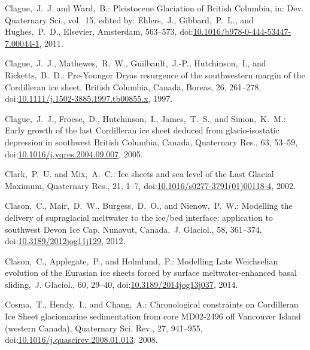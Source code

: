 \documentclass[tc, manuscript]{copernicus}
\begin{document}
\begin{thebibliography}{114}
Clague,~J.~J. and Ward,~B.: Pleistocene Glaciation of British
Columbia, in:   Dev. Quaternary Sci., vol.~15, edited by: Ehlers,~J., Gibbard,~P.~L., and Hughes,~P.~D., Elsevier, Amsterdam, 563--573,
doi:\href{http://dx.doi.org/10.1016/b978-0-444-53447-7.00044-1}{10.1016/b978-0-444-53447-7.00044-1}, 2011.


Clague,~J.~J., Mathewes,~R.~W., Guilbault,~J.-P., Hutchinson,~I., and Ricketts,~B.~D.: Pre-Younger Dryas resurgence of the southwestern margin of the Cordilleran ice sheet, British Columbia, Canada, Boreas, 26, 261--278,
doi:\href{http://dx.doi.org/10.1111/j.1502-3885.1997.tb00855.x}{10.1111/j.1502-3885.1997.tb00855.x}, 1997.


Clague,~J.~J., Froese,~D., Hutchinson,~I., James,~T.~S., and Simon,~K.~M.: Early growth of the last Cordilleran ice sheet deduced from glacio-isostatic depression in southwest British Columbia, Canada, Quaternary Res., 63, 53--59,
doi:\href{http://dx.doi.org/10.1016/j.yqres.2004.09.007}{10.1016/j.yqres.2004.09.007}, 2005.


Clark,~P.~U. and Mix,~A.~C.: Ice sheets and sea level of the Last Glacial Maximum, Quaternary Res., 21, 1--7,
doi:\href{http://dx.doi.org/10.1016/s0277-3791(01)00118-4}{10.1016/s0277-3791(01)00118-4}, 2002.


Clason,~C., Mair,~D.~W., Burgess,~D.~O., and Nienow,~P.~W.: Modelling the delivery of supraglacial meltwater to the ice/bed interface: application to southwest Devon Ice Cap, Nunavut, Canada,~J. Glaciol., 58, 361--374,
doi:\href{http://dx.doi.org/10.3189/2012jog11j129}{10.3189/2012jog11j129}, 2012.


Clason,~C., Applegate,~P., and Holmlund,~P.: Modelling Late Weichselian evolution of the Eurasian ice sheets forced by surface meltwater-enhanced basal sliding,~J. Glaciol., 60, 29--40,
doi:\href{http://dx.doi.org/10.3189/2014jog13j037}{10.3189/2014jog13j037}, 2014.


Cosma,~T., Hendy,~I., and Chang,~A.: Chronological constraints on Cordilleran Ice Sheet glaciomarine sedimentation from core MD02-2496 off Vancouver Island (western Canada), Quaternary Sci. Rev., 27, 941--955,
doi:\href{http://dx.doi.org/10.1016/j.quascirev.2008.01.013}{10.1016/j.quascirev.2008.01.013}, 2008.



\end{thebibliography}
\end{document}
